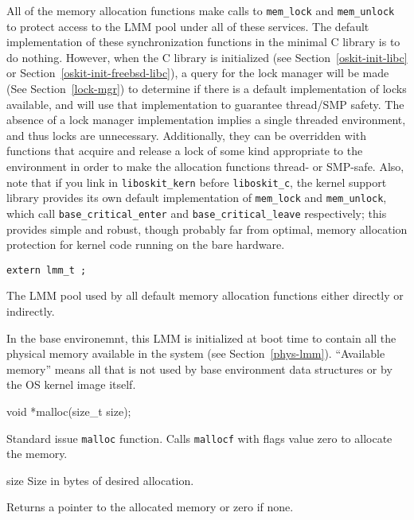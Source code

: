 All of the memory allocation functions make calls to {\tt mem_lock}
and {\tt mem_unlock} to protect access to the LMM pool under 
all of these services.  The default implementation of these
synchronization functions in the minimal C library is to do nothing.
However, when the C library is initialized (see
Section~\ref{oskit-init-libc} or Section~\ref{oskit-init-freebsd-libc}),
a query for the lock manager will be made
(See Section~\ref{lock-mgr}) to determine if there is a default
implementation of locks available, and will use that implementation to
guarantee thread/SMP safety. The absence of a lock manager implementation
implies a single threaded environment, and thus locks are unnecessary.
Additionally, they can be overridden with functions
that acquire and release a lock of some kind appropriate to the environment
in order to make the allocation functions thread- or SMP-safe.
Also, note that if you link in {\tt liboskit_kern} before {\tt liboskit_c},
the kernel support library provides its own default implementation
of {\tt mem_lock} and {\tt mem_unlock},
which call {\tt base_critical_enter} and {\tt base_critical_leave}
respectively;
this provides simple and robust, though probably far from optimal,
memory allocation protection for kernel code running on the bare hardware.

\label{malloc-lmm}
\begin{apisyn}

	{\tt extern lmm_t ;}
\end{apisyn}
\begin{apidesc}
	The LMM pool used by all default memory allocation functions
	either directly or indirectly.

	In the base environemnt,
	this LMM is initialized at boot time to contain all
	the physical memory available in the system
	(see Section~\ref{phys-lmm}).
	``Available memory'' means all that is not used by base
	environment data structures or by the OS kernel image itself.
\end{apidesc}

\label{malloc}
\begin{apisyn}

	\funcproto void *malloc(size_t size);
\end{apisyn}
\begin{apidesc}
	Standard issue {\tt malloc} function.
	Calls {\tt mallocf} with flags value zero to allocate the memory.
\end{apidesc}
\begin{apiparm}
	\item[size]
		Size in bytes of desired allocation.
\end{apiparm}
\begin{apiret}
	Returns a pointer to the allocated memory or zero if none.
\end{apiret}

